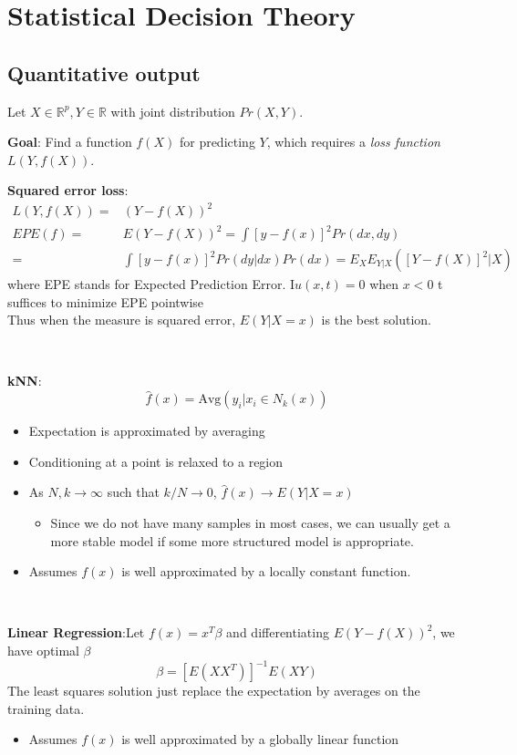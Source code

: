 \section{Statistical Decision Theory}
\subsection{Quantitative output}
Let $X\in\mathbb{R}^p, Y\in\mathbb{R}$ with joint distribution $Pr(X,Y)$. 

\textbf{Goal}: Find a function $f(X)$ for predicting $Y$, which requires a \textit{loss function} $L(Y, f(X))$. 

\textbf{Squared error loss}: 
\begin{align*}
	L(Y,f(X))=&(Y-f(X))^2\\
	EPE(f)=&E(Y-f(X))^2=\int[y-f(x)]^2Pr(dx,dy)\\
	=&\int[y-f(x)]^2Pr(dy|dx)Pr(dx)=E_XE_{Y|X}([Y-f(X)]^2|X)
\end{align*}
where EPE stands for Expected Prediction Error. I$u(x,t)=0$ when $x<0$ t suffices to minimize EPE pointwise
\begin{equation*}
\end{equation*}
Thus when the measure is squared error, $E(Y|X=x)$ is the best solution. 

~

\textbf{kNN}: 
\begin{equation*}
	\hat{f}(x)=\text{Avg}(y_i|x_i\in N_k(x))
\end{equation*}
\begin{itemize}
	\item Expectation is approximated by averaging
	\item Conditioning at a point is relaxed to a region
	\item As $N,k\rightarrow\infty$ such that $k/N\rightarrow0$, $\hat{f}(x)\rightarrow E(Y|X=x)$
	\begin{itemize}
		\item Since we do not have many samples in most cases, we can usually get a more stable model if some more structured model is appropriate. 
	\end{itemize}
	\item Assumes $f(x)$ is well approximated by a locally constant function. 
\end{itemize}

~

\textbf{Linear Regression}:Let $f(x)=x^T\beta$ and differentiating $E(Y-f(X))^2$, we have optimal $\beta$
\begin{equation*}
	\beta=[E(XX^T)]^{-1}E(XY)
\end{equation*}
The least squares solution just replace the expectation by averages on the training data. 
\begin{itemize}
	\item Assumes $f(x)$ is well approximated by a globally linear function
\end{itemize}

